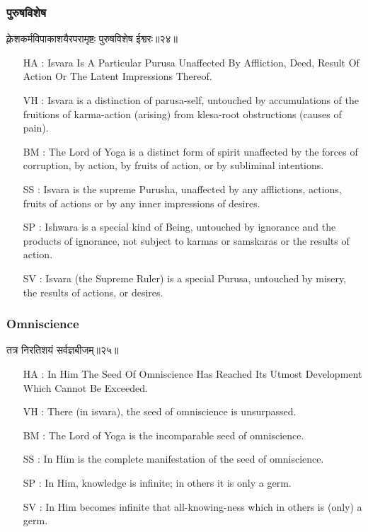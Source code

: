 \begin{frame}[fragile]\frametitle{पुरुषविशेष}
\begin{sanskrit}
क्लेशकर्मविपाकाशयैरपरामृष्टः पुरुषविशेष ईश्वरः॥२४॥
\end{sanskrit}

	\begin{itemize}
	\item [HA]: Isvara Is A Particular Purusa Unaffected By Affliction, Deed, Result Of Action Or The Latent Impressions Thereof.
	\item [VH]: Isvara is a distinction of parusa-self, untouched by accumulations of the fruitions of karma-action (arising) from klesa-root obstructions (causes of pain).
	\item [BM]: The Lord of Yoga is a distinct form of spirit unaffected by the forces of corruption, by action, by fruits of action, or by subliminal intentions.
	\item [SS]: Isvara is the supreme Purusha, unaffected by any afflictions, actions, fruits of actions or by any inner impressions of desires.
	\item [SP]: Ishwara is a special kind of Being, untouched by ignorance and the products of ignorance, not subject to karmas or samskaras or the results of action.
	\item [SV]: Isvara (the Supreme Ruler) is a special Purusa, untouched by misery, the results of actions, or desires. 
	\end{itemize}
\end{frame}

\begin{frame}[fragile]\frametitle{Omniscience}
\begin{sanskrit}
तत्र निरतिशयं सर्वज्ञबीजम्॥२५॥
\end{sanskrit}

	\begin{itemize}
	\item [HA]: In Him The Seed Of Omniscience Has Reached Its Utmost Development Which Cannot Be Exceeded.
	\item [VH]: There (in isvara), the seed of omniscience is unsurpassed.
	\item [BM]: The Lord of Yoga is the incomparable seed of omniscience.
	\item [SS]: In Him is the complete manifestation of the seed of omniscience.
	\item [SP]: In Him, knowledge is infinite; in others it is only a germ.
	\item [SV]: In Him becomes infinite that all-knowing-ness which in others is (only) a germ. 
	\end{itemize}
\end{frame}

